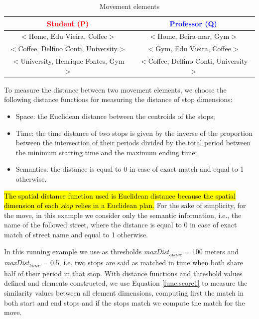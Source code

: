 \documentclass[12pt]{article}
\begin{document}
\begin{table}[h!]
\scriptsize
  \centering
  \begin{tabular}{|c|c|}
  	\hline
		\textcolor{Red}{\textbf{Student (P)}} & \textcolor{Blue}{\textbf{Professor (Q)}}\\
  	\hline
      $<$Home, Edu Vieira, Coffee$>$&$<$Home, Beira-mar, Gym$>$\\
      $<$Coffee, Delfino Conti, University$>$&$<$Gym, Edu Vieira, Coffee$>$\\
      $<$University, Henrique Fontes, Gym$>$&$<$Coffee, Delfino Conti, University$>$\\
  	\hline
  \end{tabular}
  \label{tab:wrong}
  \caption{Movement elements}
  \label{tab:SMSM_tuples}
\end{table}

To measure the distance between two movement elements, we choose the following distance functions for measuring the distance of stop dimensions:
\begin{itemize}
  \item Space: the Euclidean distance between the centroids of the stops;
  \item Time: the time distance of two stops is given by the inverse of the proportion between the intersection of their periods divided by the total period between the minimum starting time and the maximum ending time;
  \item Semantics: the distance is equal to 0 in case of exact match and equal to 1 otherwise.
\end{itemize}
\hl{The spatial distance function used is Euclidean distance because the spatial dimension of each {\emph{stop}} relies in a Euclidean plan.}
For the sake of simplicity, for the move, in this example we consider only the semantic information, i.e., the name of the followed street, where the distance is equal to 0 in case of exact match of street name and equal to 1 otherwise.

In this running example we use as thresholds \textit{maxDist\textsubscript{space}} = 100 meters and \textit{maxDist\textsubscript{time}} = 0.5, i.e. two stops are said as matched in time when both share half of their period in that stop.
With distance functions and threshold values defined and elements constructed, we use Equation \ref{func:score1} to measure the similarity values between all element dimensions, computing first the match in both start and end stops and if the stops match we compute the match for the move. 
\end{document}

